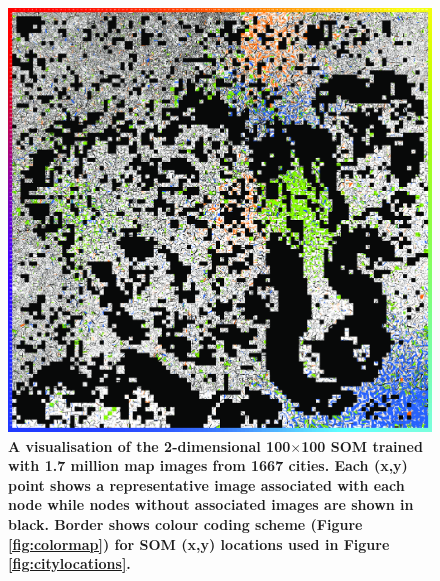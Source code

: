 \begin{figure}
\centering
\includegraphics[trim={0 0 0 0},clip,scale=0.17]{BlockTypologies_Figures2-0.png}
\caption{\bf A visualisation of the 2-dimensional 100$\times$100 SOM trained with 1.7 million map images from 1667 cities. Each (x,y) point shows a representative image associated with each node while nodes without associated images are shown in black. Border shows colour coding scheme (Figure \ref{fig:colormap}) for SOM (x,y) locations used in Figure \ref{fig:citylocations}.}
 \label{fig:somresults}
\end{figure} 

